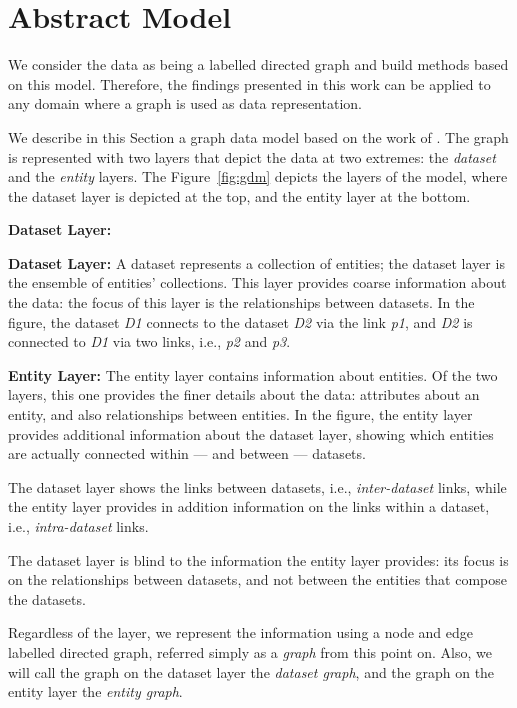 \section{Abstract Model}
\label{chap:ssd:gdm:abstract-model}

We consider the data as being a labelled directed graph and build methods based on this model. Therefore, the findings presented in this work can be applied to any domain where a graph is used as data representation.

We describe in this Section a graph data model based on the work of \cite{delbru:jws:entity}. The graph is represented with two layers that depict the data at two extremes: the \emph{dataset} and the \emph{entity} layers. The Figure~\ref{fig:gdm} depicts the layers of the model, where the dataset layer is depicted at the top, and the entity layer at the bottom.
\begin{labeling}{\textbf{Dataset Layer:}}
	\item[\textbf{Dataset Layer:}] A dataset represents a collection of entities; the dataset layer is the ensemble of entities' collections. This layer provides coarse information about the data: the focus of this layer is the relationships between datasets. In the figure, the dataset \emph{D1} connects to the dataset \emph{D2} via the link \emph{p1}, and \emph{D2} is connected to \emph{D1} via two links, i.e., \emph{p2} and \emph{p3}.
	\item[\textbf{Entity Layer:}] The entity layer contains information about entities. Of the two layers, this one provides the finer details about the data: attributes about an entity, and also relationships between entities. In the figure, the entity layer provides additional information about the dataset layer, showing which entities are actually connected within --- and between --- datasets.
\end{labeling}

The dataset layer shows the links between datasets, i.e., \emph{inter-dataset} links, while the entity layer provides in addition information on the links within a dataset, i.e., \emph{intra-dataset} links.

The dataset layer is blind to the information the entity layer provides: its focus is on the relationships between datasets, and not between the entities that compose the datasets.

Regardless of the layer, we represent the information using a node and edge labelled directed graph, referred simply as a \emph{graph} from this point on. Also, we will call the graph on the dataset layer the \emph{dataset graph}, and the graph on the entity layer the \emph{entity graph}.

